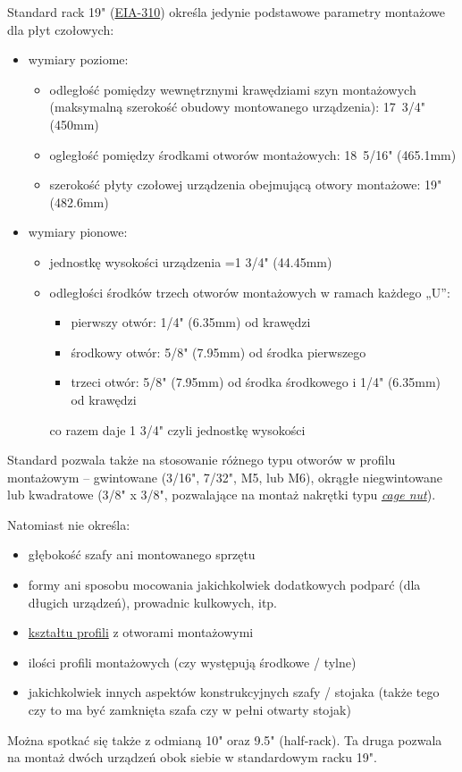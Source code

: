 Standard rack 19" (\href{https://www.server-racks.com/eia-310.html}{EIA-310}) określa jedynie podstawowe parametry montażowe dla płyt czołowych:
\begin{itemize}
	\item wymiary poziome:
	\begin{itemize}
		\item odległość pomiędzy wewnętrznymi krawędziami szyn montażowych (maksymalną szerokość obudowy montowanego urządzenia): 17~3/4" (450mm)
		\item ogległość pomiędzy środkami otworów montażowych: 18~5/16" (465.1mm)
		\item szerokość płyty czołowej urządzenia obejmującą otwory montażowe: 19" (482.6mm)
	\end{itemize}
	\item wymiary pionowe:
	\begin{itemize}
		\item jednostkę wysokości urządzenia =1 3/4" (44.45mm)
		\item odległości środków trzech otworów montażowych w ramach każdego „U”:
			\begin{itemize}
				\item pierwszy otwór: 1/4" (6.35mm) od krawędzi
				\item środkowy otwór: 5/8" (7.95mm) od środka pierwszego
				\item trzeci otwór: 5/8" (7.95mm) od środka środkowego i 1/4" (6.35mm) od krawędzi
			\end{itemize}
			co razem daje 1 3/4" czyli jednostkę wysokości
	\end{itemize}
\end{itemize}

Standard pozwala także na stosowanie różnego typu otworów w profilu montażowym – gwintowane (3/16", 7/32", M5, lub M6), okrągłe niegwintowane lub kwadratowe (3/8" x 3/8", pozwalające na montaż nakrętki typu \textit{\href{https://www.server-racks.com/what-is-a-cagenut.html}{cage nut}}).

Natomiast nie określa:
\begin{itemize}
	\item głębokość szafy ani montowanego sprzętu
	\item formy ani sposobu mocowania jakichkolwiek dodatkowych podparć (dla długich urządzeń), prowadnic kulkowych, itp.
	\item \href{https://www.server-racks.com/rack-upright-shape.html}{kształtu profili} z otworami montażowymi
	\item ilości profili montażowych (czy występują środkowe / tylne)
	\item jakichkolwiek innych aspektów konstrukcyjnych szafy / stojaka (także tego czy to ma być zamknięta szafa czy w pełni otwarty stojak)
\end{itemize}

Można spotkać się także z odmianą 10" oraz 9.5" (half-rack). Ta druga pozwala na montaż dwóch urządzeń obok siebie w standardowym racku 19".
